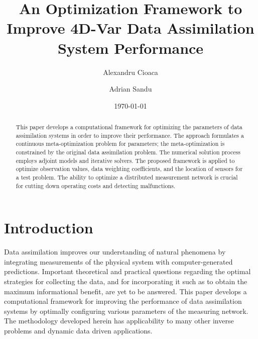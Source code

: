\documentclass{article}
\begin{document}
\title{An Optimization Framework to Improve 4D-Var Data Assimilation System Performance}

\date{\today}

\author{Alexandru Cioaca}
\author{Adrian Sandu}




\maketitle

\begin{abstract}

This paper develops  a computational framework for optimizing the parameters
of data assimilation systems in order to improve their performance.
The approach formulates a continuous meta-optimization 
problem for parameters; the meta-optimization is constrained by the original data assimilation problem.
The numerical solution process
employs adjoint models and iterative solvers. The proposed framework is
applied to optimize observation values, 
data weighting coefficients, and the location of sensors for a test problem.
The ability to optimize a distributed measurement network is crucial
for cutting down operating costs and detecting malfunctions.

\end{abstract}

\tableofcontents
\newpage



\section{Introduction}


Data assimilation improves our understanding of natural phenomena by
integrating measurements of the physical system with computer-generated predictions.
Important theoretical and practical questions
regarding the optimal strategies for collecting the data, and for incorporating it
 such as to obtain the maximum informational benefit, are yet to be answered. 
This paper develops a computational framework for improving the performance of
data assimilation systems by optimally configuring  various parameters of the measuring network.
The methodology developed herein has applicability to many other inverse problems and dynamic data driven applications.
\end{document}

